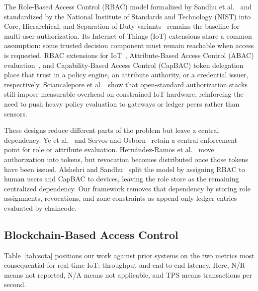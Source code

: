 \documentclass[a4paper,fleqn]{cas-dc}
\begin{document}
The Role-Based Access Control (RBAC) model formalized by Sandhu
et al.~\cite{sandhu1996role} and standardized by the National
Institute of Standards and Technology (NIST) into Core, Hierarchical,
and Separation of Duty variants~\cite{ferraiolo2001role} remains the
baseline for multi-user authorization. Its Internet of Things (IoT)
extensions share a common assumption: some trusted decision component
must remain reachable when access is requested. RBAC extensions for
IoT~\cite{ye2015iot}, Attribute-Based Access Control (ABAC)
evaluation~\cite{hu2014guide,servos2017abac,sciancalepore2017oauth}, and Capability-Based
Access Control (CapBAC) token delegation~\cite{hernandez2017capability}
place that trust in a policy engine, an attribute authority, or a
credential issuer, respectively. Sciancalepore et al.~\cite{sciancalepore2017oauth}
show that open-standard authorization stacks still impose measurable
overhead on constrained IoT hardware, reinforcing the need to push
heavy policy evaluation to gateways or ledger peers rather than
sensors.

These designs reduce different parts of the problem but leave a
central dependency. Ye et al.~\cite{ye2015iot} and Servos and
Osborn~\cite{servos2017abac} retain a central enforcement point for
role or attribute evaluation. Hern\'{a}ndez-Ramos et
al.~\cite{hernandez2017capability} move authorization into tokens, but
revocation becomes distributed once those tokens have been issued.
Alshehri and Sandhu~\cite{alshehri2016access} split the model by
assigning RBAC to human users and CapBAC to devices, leaving the role
store as the remaining centralized dependency. Our framework removes
that dependency by storing role assignments, revocations, and zone
constraints as append-only ledger entries evaluated by chaincode.

\subsection{Blockchain-Based Access Control}
\label{subsec:blockchain_ac}

Table~\ref{tab:sota} positions our work against prior systems on the
two metrics most consequential for real-time IoT: throughput and
end-to-end latency. Here, N/R means not reported, N/A means not
applicable, and TPS means transactions per second.
\end{document}
